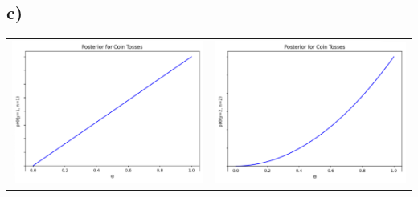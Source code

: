 \documentclass[]{article}
\begin{document}
\subsection*{c)} 
\begin{center}
    \begin{tabular}{cc}
        \includegraphics[scale = 0.25]{1_c_1.png} & \includegraphics[scale = 0.25]{1_c_2.png}\\

\end{tabular}
\end{center}
\end{document}
